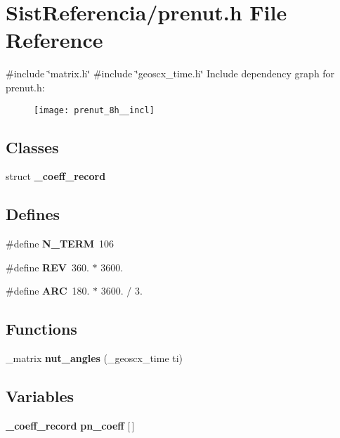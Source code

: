 \section{\-Sist\-Referencia/prenut.h \-File \-Reference}
\label{prenut_8h}
{\ttfamily \#include \char`\"{}matrix.\-h\char`\"{}}\*
{\ttfamily \#include \char`\"{}geoscx\-\_\-time.\-h\char`\"{}}\*
\-Include dependency graph for prenut.\-h\-:\nopagebreak
\begin{figure}[H]
\begin{center}
\leavevmode
\texttt{[image: prenut\_8h\_\_incl]}
\end{center}
\end{figure}
\subsection*{\-Classes}
\begin{DoxyCompactItemize}
\item 
struct {\bf \-\_\-coeff\-\_\-record}
\end{DoxyCompactItemize}
\subsection*{\-Defines}
\begin{DoxyCompactItemize}
\item 
\#define {\bf \-N\-\_\-\-T\-E\-R\-M}~106
\item 
\#define {\bf \-R\-E\-V}~360. $\ast$ 3600.
\item 
\#define {\bf \-A\-R\-C}~180. $\ast$ 3600. / 3.
\end{DoxyCompactItemize}
\subsection*{\-Functions}
\begin{DoxyCompactItemize}
\item 
\-\_\-matrix {\bf nut\-\_\-angles} (\-\_\-geoscx\-\_\-time ti)
\end{DoxyCompactItemize}
\subsection*{\-Variables}
\begin{DoxyCompactItemize}
\item 
{\bf \-\_\-coeff\-\_\-record} {\bf pn\-\_\-coeff} [$\,$]
\end{DoxyCompactItemize}


